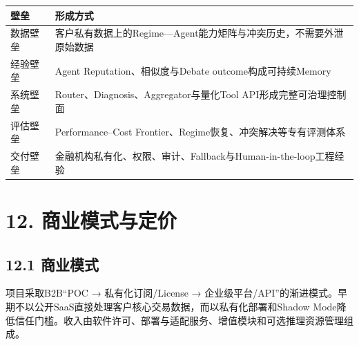 \documentclass[12pt,a4paper]{ctexart}
\begin{document}
\begin{longtable}[]{@{}
  >{\raggedright\arraybackslash}p{}
  >{\raggedright\arraybackslash}p{}@{}}
\toprule\noalign{}
\begin{minipage}[b]{\linewidth}\centering
\textbf{壁垒}
\end{minipage} & \begin{minipage}[b]{\linewidth}\centering
\textbf{形成方式}
\end{minipage} \\
\midrule\noalign{}
\endhead
\bottomrule\noalign{}
\endlastfoot
数据壁垒 &
客户私有数据上的Regime---Agent能力矩阵与冲突历史，不需要外泄原始数据 \\
经验壁垒 & Agent Reputation、相似度与Debate outcome构成可持续Memory \\
系统壁垒 & Router、Diagnosis、Aggregator与量化Tool
API形成完整可治理控制面 \\
评估壁垒 & Performance--Cost
Frontier、Regime恢复、冲突解决等专有评测体系 \\
交付壁垒 &
金融机构私有化、权限、审计、Fallback与Human-in-the-loop工程经验 \\
\end{longtable}

\section{\texorpdfstring{\textbf{12.
商业模式与定价}}{12. 商业模式与定价}}\label{ux5546ux4e1aux6a21ux5f0fux4e0eux5b9aux4ef7}

\subsection{\texorpdfstring{\textbf{12.1
商业模式}}{12.1 商业模式}}\label{ux5546ux4e1aux6a21ux5f0f}

项目采取B2B``POC → 私有化订阅/License →
企业级平台/API''的渐进模式。早期不以公开SaaS直接处理客户核心交易数据，而以私有化部署和Shadow
Mode降低信任门槛。收入由软件许可、部署与适配服务、增值模块和可选推理资源管理组成。
\end{document}
